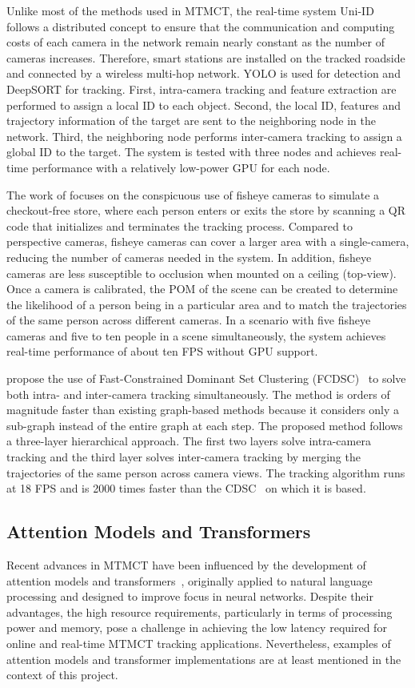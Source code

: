 Unlike most of the methods used in MTMCT, the real-time system Uni-ID~\cite{Chen22} follows a distributed concept to ensure that the communication and computing costs of each camera in the network remain nearly constant as the number of cameras increases. Therefore, smart stations are installed on the tracked roadside and connected by a wireless multi-hop network. YOLO is used for detection and DeepSORT for tracking. First, intra-camera tracking and feature extraction are performed to assign a local ID to each object. Second, the local ID, features and trajectory information of the target are sent to the neighboring node in the network. Third, the neighboring node performs inter-camera tracking to assign a global ID to the target. The system is tested with three nodes and achieves real-time performance with a relatively low-power GPU for each node.

The work of \textcite{Wang21} focuses on the conspicuous use of fisheye cameras to simulate a checkout-free store, where each person enters or exits the store by scanning a QR code that initializes and terminates the tracking process. Compared to perspective cameras, fisheye cameras can cover a larger area with a single-camera, reducing the number of cameras needed in the system. In addition, fisheye cameras are less susceptible to occlusion when mounted on a ceiling (top-view). Once a camera is calibrated, the POM of the scene can be created to determine the likelihood of a person being in a particular area and to match the trajectories of the same person across different cameras. In a scenario with five fisheye cameras and five to ten people in a scene simultaneously, the system achieves real-time performance of about ten FPS without GPU support.

\citeauthor{Tesfaye19} propose the use of Fast-Constrained Dominant Set Clustering (FCDSC)~\cite{Tesfaye19} to solve both intra- and inter-camera tracking simultaneously. The method is orders of magnitude faster than existing graph-based methods because it  considers only a sub-graph instead of the entire graph at each step. The proposed method follows a three-layer hierarchical approach. The first two layers solve intra-camera tracking and the third layer solves inter-camera tracking by merging the trajectories of the same person across camera views. The tracking algorithm runs at 18 FPS and is 2000 times faster than the CDSC~\cite{Zemene16} on which it is based.

\subsection{Attention Models and Transformers}\label{subsec:attention_models_and_transformers}
Recent advances in MTMCT have been influenced by the development of attention models and transformers~\cite{Vaswani17}, originally applied to natural language processing and designed to improve focus in neural networks. Despite their advantages, the high resource requirements, particularly in terms of processing power and memory, pose a challenge in achieving the low latency required for online and real-time MTMCT tracking applications. Nevertheless, examples of attention models and transformer implementations are at least mentioned in the context of this project.

